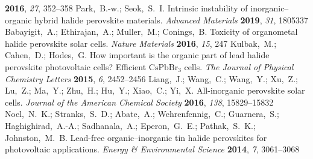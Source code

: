 \documentclass[journal=jpclcd,manuscript=letter]{achemso}
\begin{document}
\begin{mcitethebibliography}{49}
  \textbf{2016}, \emph{27}, 352--358\relax
\mciteBstWouldAddEndPuncttrue
\mciteSetBstMidEndSepPunct{\mcitedefaultmidpunct}
{\mcitedefaultendpunct}{\mcitedefaultseppunct}\relax
\EndOfBibitem
{}
Park,~B.-w.; Seok,~S.~I. Intrinsic instability of inorganic--organic hybrid
  halide perovskite materials. \emph{Advanced Materials} \textbf{2019},
  \emph{31}, 1805337\relax
\mciteBstWouldAddEndPuncttrue
\mciteSetBstMidEndSepPunct{\mcitedefaultmidpunct}
{\mcitedefaultendpunct}{\mcitedefaultseppunct}\relax
\EndOfBibitem
{}
Babayigit,~A.; Ethirajan,~A.; Muller,~M.; Conings,~B. Toxicity of organometal
  halide perovskite solar cells. \emph{Nature Materials} \textbf{2016},
  \emph{15}, 247\relax
\mciteBstWouldAddEndPuncttrue
\mciteSetBstMidEndSepPunct{\mcitedefaultmidpunct}
{\mcitedefaultendpunct}{\mcitedefaultseppunct}\relax
\EndOfBibitem
{}
Kulbak,~M.; Cahen,~D.; Hodes,~G. How important is the organic part of lead
  halide perovskite photovoltaic cells? Efficient ${\mathrm{CsPbBr}}_{3}$
  cells. \emph{The Journal of Physical Chemistry Letters} \textbf{2015},
  \emph{6}, 2452--2456\relax
\mciteBstWouldAddEndPuncttrue
\mciteSetBstMidEndSepPunct{\mcitedefaultmidpunct}
{\mcitedefaultendpunct}{\mcitedefaultseppunct}\relax
\EndOfBibitem
{}
Liang,~J.; Wang,~C.; Wang,~Y.; Xu,~Z.; Lu,~Z.; Ma,~Y.; Zhu,~H.; Hu,~Y.;
  Xiao,~C.; Yi,~X.   All-inorganic perovskite solar cells.
  \emph{Journal of the American Chemical Society} \textbf{2016}, \emph{138},
  15829--15832\relax
\mciteBstWouldAddEndPuncttrue
\mciteSetBstMidEndSepPunct{\mcitedefaultmidpunct}
{\mcitedefaultendpunct}{\mcitedefaultseppunct}\relax
\EndOfBibitem
{}
Noel,~N.~K.; Stranks,~S.~D.; Abate,~A.; Wehrenfennig,~C.; Guarnera,~S.;
  Haghighirad,~A.-A.; Sadhanala,~A.; Eperon,~G.~E.; Pathak,~S.~K.;
  Johnston,~M.~B.   Lead-free organic--inorganic tin halide
  perovskites for photovoltaic applications. \emph{Energy \& Environmental
  Science} \textbf{2014}, \emph{7}, 3061--3068\relax
\mciteBstWouldAddEndPuncttrue
\mciteSetBstMidEndSepPunct{\mcitedefaultmidpunct}
{\mcitedefaultendpunct}{\mcitedefaultseppunct}\relax

\end{mcitethebibliography}
\end{document}
